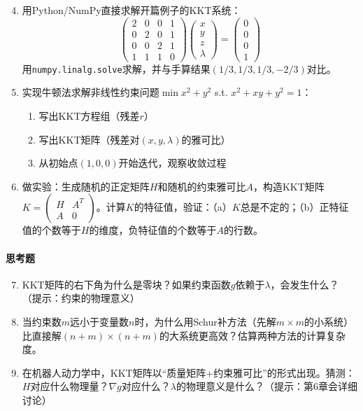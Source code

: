 \begin{enumerate}
    \setcounter{enumi}{3}
    \item 用Python/NumPy直接求解开篇例子的KKT系统：
    \[
    \begin{pmatrix} 
    2 & 0 & 0 & 1 \\
    0 & 2 & 0 & 1 \\
    0 & 0 & 2 & 1 \\
    1 & 1 & 1 & 0
    \end{pmatrix}
    \begin{pmatrix} x \\ y \\ z \\ \lambda \end{pmatrix} = 
    \begin{pmatrix} 0 \\ 0 \\ 0 \\ 1 \end{pmatrix}
    \]
    用\texttt{numpy.linalg.solve}求解，并与手算结果$(1/3, 1/3, 1/3, -2/3)$对比。
    
    \item 实现牛顿法求解非线性约束问题$\min x^2 + y^2$ s.t. $x^2 + xy + y^2 = 1$：
    \begin{enumerate}
        \item 写出KKT方程组（残差$r$）
        \item 写出KKT矩阵（残差对$(x,y,\lambda)$的雅可比）
        \item 从初始点$(1, 0, 0)$开始迭代，观察收敛过程
    \end{enumerate}
    
    \item 做实验：生成随机的正定矩阵$H$和随机的约束雅可比$A$，构造KKT矩阵$K = \begin{pmatrix} H & A^T \\ A & 0 \end{pmatrix}$。计算$K$的特征值，验证：（a）$K$总是不定的；（b）正特征值的个数等于$H$的维度，负特征值的个数等于$A$的行数。
\end{enumerate}

\paragraph{思考题}

\begin{enumerate}
    \setcounter{enumi}{6}
    \item KKT矩阵的右下角为什么是零块？如果约束函数$g$依赖于$\lambda$，会发生什么？（提示：约束的物理意义）
    
    \item 当约束数$m$远小于变量数$n$时，为什么用Schur补方法（先解$m \times m$的小系统）比直接解$(n+m) \times (n+m)$的大系统更高效？估算两种方法的计算复杂度。
    
    \item 在机器人动力学中，KKT矩阵以“质量矩阵+约束雅可比”的形式出现。猜测：$H$对应什么物理量？$\nabla g$对应什么？$\lambda$的物理意义是什么？（提示：第6章会详细讨论）
\end{enumerate}

